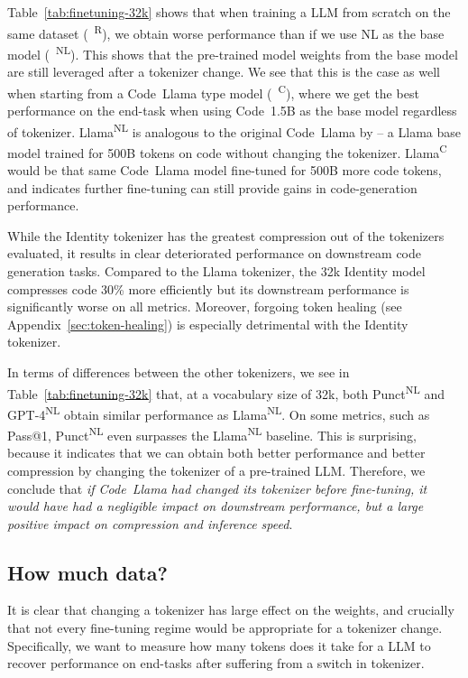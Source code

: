 Table~\ref{tab:finetuning-32k} shows that when training a LLM from scratch on the same dataset (~\textsuperscript{R}), we obtain worse performance than if we use NL as the base model (~\textsuperscript{NL}).
This shows that the pre-trained model weights from the base model are still leveraged after a tokenizer change. We see that this is the case as well when starting from a Code~Llama type model (~\textsuperscript{C}), where we get the best performance on the end-task when using Code~1.5B as the base model regardless of tokenizer.
Llama\textsuperscript{NL} is analogous to the original Code~Llama by \citet{roziere2023code} -- a Llama base model trained for 500B tokens on code without changing the tokenizer. 
Llama\textsuperscript{C} would be that same Code~Llama model fine-tuned for 500B more code tokens, and indicates further fine-tuning can still provide gains in code-generation performance.

While the Identity tokenizer has the greatest compression out of the tokenizers evaluated, it results in clear deteriorated performance on downstream code generation tasks. Compared to the Llama tokenizer, the 32k Identity model compresses code 30\% more efficiently but its downstream performance is significantly worse on all metrics. Moreover, forgoing token healing (see Appendix~\ref{sec:token-healing}) is especially detrimental with the Identity tokenizer.

In terms of differences between the other tokenizers, we see in Table~\ref{tab:finetuning-32k} that, at a vocabulary size of 32k, both Punct\textsuperscript{NL} and GPT-4\textsuperscript{NL} obtain similar performance as Llama\textsuperscript{NL}.
On some metrics, such as Pass@1, Punct\textsuperscript{NL} even surpasses the Llama\textsuperscript{NL} baseline. This is surprising, because it indicates that we can obtain both better performance and better compression by changing the tokenizer of a pre-trained LLM. Therefore, we conclude that \textit{if Code~Llama had changed its tokenizer before fine-tuning, it would have had a negligible impact on downstream performance, but a large positive impact on compression and inference speed}.

\subsection{How much data?} 

It is clear that changing a tokenizer has large effect on the weights, and crucially that not every fine-tuning regime would be appropriate for a tokenizer change. Specifically, we want to measure how many tokens does it take for a LLM to recover performance on end-tasks after suffering from a switch in tokenizer.

